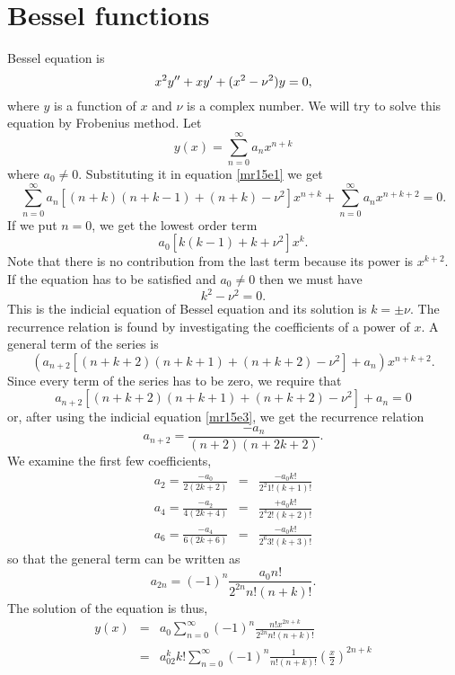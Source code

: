 \section{Bessel functions}\label{mr15}
Bessel equation is 
\begin{equation}\label{mr15e1}
x^2y^{\prime\prime} + xy^\prime + (x^2 - \nu^2)y = 0,
\end{equation}
where $y$ is a function of $x$ and $\nu$ is a complex number. We will try to solve this equation by Frobenius method. Let
\begin{equation}\label{mr15e2}
y(x) = \sum_{n=0}^\infty a_nx^{n+k}
\end{equation}
where $a_0 \ne 0$. Substituting it in equation \eqref{mr15e1} we get
\[
\sum_{n=0}^\infty a_n\left[(n+k)(n+k-1) + (n+k) - \nu^2\right]x^{n+k} + \sum_{n=0}^\infty a_nx^{n+k+2} = 0.
\]
If we put $n=0$, we get the lowest order term
\[
a_0[k(k-1) + k + \nu^2]x^k.
\]
Note that there is no contribution from the last term because its power is $x^{k+2}$. If the equation has to be satisfied and $a_0 \ne 0$ then we must have
\begin{equation}\label{mr15e3}
k^2 - \nu^2 = 0.
\end{equation}
This is the indicial equation of Bessel equation and its solution is $k = \pm\nu$. The recurrence relation is found by investigating the coefficients of a power of $x$. A general term of the series is
\[
\left(a_{n+2}\left[(n+k+2)(n+k+1) + (n+k+2) - \nu^2\right] + a_n\right)x^{n+k+2}.
\]
Since every term of the series has to be zero, we require that 
\[
a_{n+2}\left[(n+k+2)(n+k+1) + (n+k+2) - \nu^2\right] + a_n = 0
\]
or, after using the indicial equation \eqref{mr15e3}, we get the recurrence relation
\begin{equation}\label{mr15e4}
a_{n+2} = \frac{-a_n}{(n+2)(n+2k+2)}.
\end{equation}
We examine the first few coefficients,
\begin{eqnarray*}
a_2 = \frac{-a_0}{2(2k+2)} &=& \frac{-a_0 k!}{2^2 1! (k+1)!} \\
a_4 = \frac{-a_2}{4(2k+4)} &=& \frac{+a_0 k!}{2^4 2! (k+2)!} \\
a_6 = \frac{-a_4}{6(2k+6)} &=& \frac{-a_0 k!}{2^6 3! (k+3)!} 
\end{eqnarray*}
so that the general term can be written as
\begin{equation}\label{mr15e5}
a_{2n} = (-1)^n\frac{a_0 n!}{2^{2n}n!(n+k)!}.
\end{equation}
The solution of the equation is thus,
\begin{eqnarray*}
y(x) &=& a_0\sum_{n=0}^\infty (-1)^n\frac{n!x^{2n+k}}{2^{2n}n!(n+k)!} \\
     &=& a_02^k k!\sum_{n=0}^\infty (-1)^n \frac{1}{n!(n+k)!}\left(\frac{x}{2}\right)^{2n+k} 
\end{eqnarray*}
